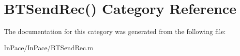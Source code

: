 \hypertarget{categoryBTSendRec_07_08}{\section{B\-T\-Send\-Rec() Category Reference}
\label{categoryBTSendRec_07_08}
}


The documentation for this category was generated from the following file\-:\begin{DoxyCompactItemize}
\item 
In\-Pace/\-In\-Pace/B\-T\-Send\-Rec.\-m\end{DoxyCompactItemize}
